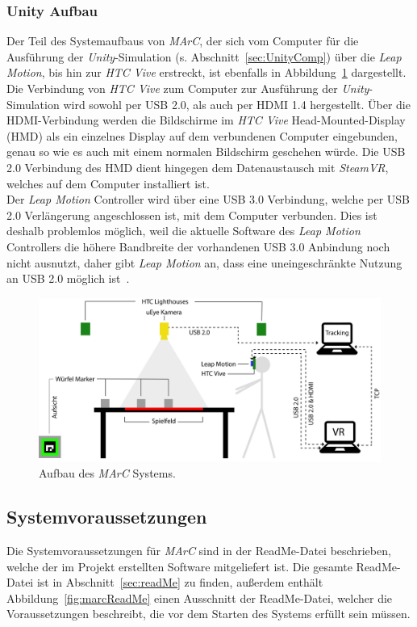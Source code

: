 \subsubsection{Unity Aufbau}
Der Teil des Systemaufbaus von \emph{MArC}, der sich vom Computer für die Ausführung der \emph{Unity}-Simulation (s. Abschnitt~\ref{sec:UnityComp}) über die \emph{Leap Motion}, bis hin zur \emph{HTC Vive} erstreckt, ist ebenfalls in Abbildung~\ref{fig:AufbauMarc} dargestellt.\\
Die Verbindung von \emph{HTC Vive} zum Computer zur Ausführung der \emph{Unity}-Simulation wird sowohl per USB 2.0, als auch per HDMI 1.4 hergestellt. Über die HDMI-Verbindung werden die Bildschirme im \emph{HTC Vive} Head-Mounted-Display (HMD) als ein einzelnes Display auf dem verbundenen Computer eingebunden, genau so wie es auch mit einem normalen Bildschirm geschehen würde. Die USB 2.0 Verbindung des HMD dient hingegen dem Datenaustausch mit \emph{SteamVR}, welches auf dem Computer installiert ist.\\
Der \emph{Leap Motion} Controller wird über eine USB 3.0 Verbindung, welche per USB 2.0 Verlängerung angeschlossen ist, mit dem Computer verbunden. Dies ist deshalb problemlos möglich, weil die aktuelle Software des \emph{Leap Motion} Controllers die höhere Bandbreite der vorhandenen USB 3.0 Anbindung noch nicht ausnutzt, daher gibt \emph{Leap Motion} an, dass eine uneingeschränkte Nutzung an USB 2.0 möglich ist~\cite{website:LeapMotionSupportQuestion}.

\begin{figure}[H]
	\centering
	\includegraphics[width=\textwidth]{Bilder/Aufbau_MArC.jpg}
	\caption{Aufbau des \textit{MArC} Systems.}
	\label{fig:AufbauMarc}
\end{figure}


\subsection{Systemvoraussetzungen}\label{sec:sysVor}
Die Systemvoraussetzungen für \emph{MArC} sind in der ReadMe-Datei beschrieben, welche der im Projekt erstellten Software mitgeliefert ist. Die gesamte ReadMe-Datei ist in Abschnitt~\ref{sec:readMe} zu finden, außerdem enthält Abbildung~\ref{fig:marcReadMe} einen Ausschnitt der ReadMe-Datei, welcher die Voraussetzungen beschreibt, die vor dem Starten des Systems erfüllt sein müssen.


